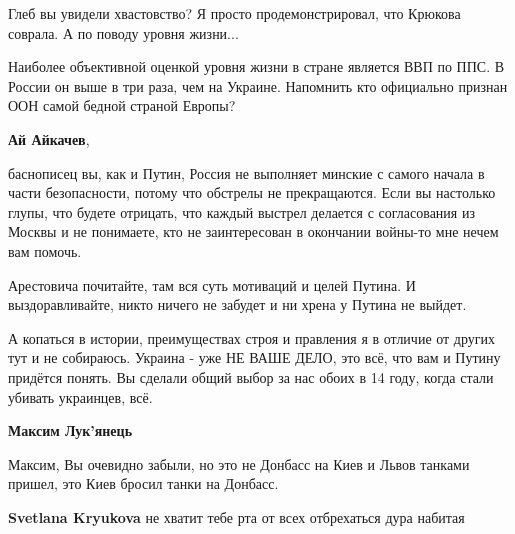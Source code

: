 \begin{itemize}
\begin{itemize}
Глеб вы увидели хвастовство? Я
просто продемонстрировал, что Крюкова соврала. А по поводу уровня жизни...

Наиболее объективной оценкой уровня жизни в стране является ВВП по ППС. В
России он выше в три раза, чем на Украине. Напомнить кто официально признан ООН
самой бедной страной Европы?

 
\textbf{Ай Айкачев}, 

баснописец вы, как и Путин, Россия не выполняет минские с самого начала в части
безопасности, потому что обстрелы не прекращаются. Если вы настолько глупы, что
будете отрицать, что каждый выстрел делается с согласования из Москвы и не
понимаете, кто не заинтересован в окончании войны-то мне нечем вам помочь. 

Арестовича почитайте, там вся суть мотиваций и целей Путина. И выздоравливайте,
никто ничего не забудет и ни хрена у Путина не выйдет. 

А копаться в истории, преимуществах строя и правления я в отличие от других тут
и не собираюсь. Украина - уже НЕ ВАШЕ ДЕЛО, это всё, что вам и Путину придётся
понять. Вы сделали общий выбор за нас обоих в 14 году, когда стали убивать
украинцев, всё.


 
\textbf{Максим Лук'янець} 

Максим, Вы очевидно забыли, но это не Донбасс на Киев и Львов танками пришел,
это Киев бросил танки на Донбасс.

 
\textbf{Svetlana Kryukova} не хватит тебе рта от всех отбрехаться дура набитая

 

\end{itemize}
\end{itemize}
